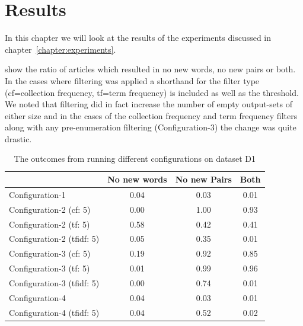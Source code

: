 \chapter{Results}
\label{chapter:results}
In this chapter we will look at the results of the experiments discussed in chapter~\ref{chapter:experiments}.

 show the ratio of articles which resulted in no new words, no new pairs or both. In the cases where filtering was applied a shorthand for the filter type (cf=collection frequency, tf=term frequency) is included as well as the threshold. We noted that filtering did in fact increase the number of empty output-sets of either size and in the cases of the collection frequency and term frequency filters along with any pre-enumeration filtering (Configuration-3) the change was quite drastic.

\begin{center}
\begin{table}
  \begin{tabular}{|l|c|c|c|}
    \hline
    &  No new words & No new Pairs & Both \\ \hline
    Configuration-1                    & 0.04  & 0.03  & 0.01 \\ \hline
    Configuration-2 (cf: 5)            & 0.00  & 1.00  & 0.93 \\ \hline
    Configuration-2 (tf: 5)            & 0.58  & 0.42  & 0.41 \\ \hline
    Configuration-2 (tfidf: 5)         & 0.05  & 0.35  & 0.01 \\ \hline
    Configuration-3 (cf: 5)            & 0.19  & 0.92  & 0.85 \\ \hline
    Configuration-3 (tf: 5)            & 0.01  & 0.99  & 0.96 \\ \hline
    Configuration-3 (tfidf: 5)         & 0.00  & 0.74  & 0.01 \\ \hline
    Configuration-4                    & 0.04  & 0.03  & 0.01 \\ \hline
    Configuration-4 (tfidf: 5)         & 0.04  & 0.52  & 0.02 \\ \hline
  \end{tabular}
  \caption{The outcomes from running different configurations on dataset D1}
  \label{tab:d1}
\end{table}
\end{center}

